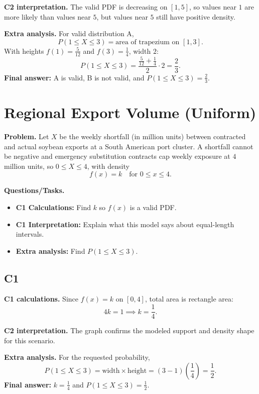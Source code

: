 	\textbf{C2 interpretation.}
	The valid PDF is decreasing on $[1,5]$, so values near $1$ are more likely than values near $5$, but values near $5$ still have positive density.
	
	\textbf{Extra analysis.}
	For valid distribution A,
	\[
	P(1\le X\le3)=\text{area of trapezium on }[1,3].
	\]
	With heights $f(1)=\frac{5}{12}$ and $f(3)=\frac14$, width $2$:
	\[
	P(1\le X\le3)=\frac{\frac{5}{12}+\frac14}{2}\cdot 2=\frac23.
	\]
	\textbf{Final answer:} A is valid, B is not valid, and $P(1\le X\le3)=\frac23$.

	\section{Regional Export Volume (Uniform)}
	
	\textbf{Problem.}
	Let $X$ be the weekly shortfall (in million units) between contracted and actual soybean exports at a South American port cluster. A shortfall cannot be negative and emergency substitution contracts cap weekly exposure at $4$ million units, so $0\le X\le 4$, with density
	\[
	f(x)=k\quad\text{for }0\le x\le 4.
	\]
	
	\textbf{Questions/Tasks.}
	\begin{itemize}
		\item \textbf{C1 Calculations:} Find $k$ so $f(x)$ is a valid PDF.
		\item \textbf{C1 Interpretation:} Explain what this model says about equal-length intervals.
		\item \textbf{Extra analysis:} Find $P(1\le X\le 3)$.
	\end{itemize}

	\subsection*{C1}

\textbf{C1 calculations.}
Since $f(x)=k$ on $[0,4]$, total area is rectangle area:
	\[
	4k=1\implies k=\frac14.
	\]

\textbf{C2 interpretation.}
The graph confirms the modeled support and density shape for this scenario.

\textbf{Extra analysis.}
For the requested probability,
\[
P(1\le X\le3)=\text{width}\times\text{height}=(3-1)\left(\frac14\right)=\frac12.
\]
\textbf{Final answer:} $k=\frac14$ and $P(1\le X\le3)=\frac12$.
